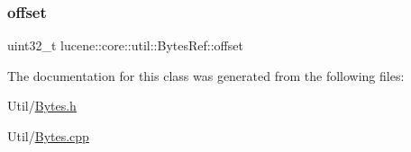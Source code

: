\subsubsection{\texorpdfstring{offset}{offset}}
{\footnotesize\ttfamily uint32\+\_\+t lucene\+::core\+::util\+::\+Bytes\+Ref\+::offset}



The documentation for this class was generated from the following files\+:\begin{DoxyCompactItemize}
\item 
Util/\mbox{\hyperlink{Bytes_8h}{Bytes.\+h}}\item 
Util/\mbox{\hyperlink{Bytes_8cpp}{Bytes.\+cpp}}\end{DoxyCompactItemize}
